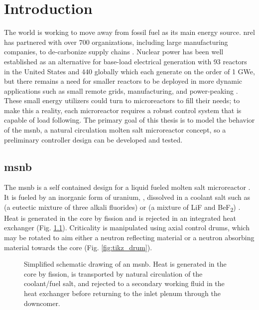 \chapter{Introduction}
\label{Chapter:Introduction}
The world is working to move away from fossil fuel as its main energy source. \acf{nrel} has partnered with over 700 organizations, including large manufacturing companies, to de-carbonize supply chains \cite{NREL-partner}. Nuclear power has been well established as an alternative for base-load electrical generation with 93 reactors in the United States and 440 globally which each generate on the order of 1 GWe, but there remains a need for smaller reactors to be deployed in more dynamic applications such as small remote grids, manufacturing, and power-peaking \cite{DoD-remote,AirForce}. These small energy utilizers could turn to microreactors to fill their needs; to make this a reality, each microreactor requires a robust control system that is capable of load following. The primary goal of this thesis is to model the behavior of the \acf{msnb}, a natural circulation molten salt microreactor concept, so a preliminary controller design can be developed and tested.

\section{\texorpdfstring{\acl{msnb}}{Molten Salt Nuclear Battery}}
The \acs{msnb} is a self contained design for a liquid fueled molten salt microreactor \cite{CarterPHD,PetersonMS}. It is fueled by an inorganic form of uranium, \UF, dissolved in a coolant salt such as \flinak (a eutectic mixture of three alkali fluorides) or \flibe  (a mixture of LiF and BeF\textsubscript{2}) \cite{RoperOverview}. Heat is generated in the core by fission and is rejected in an integrated heat exchanger (Fig. \ref{fig:tikz_msnb}). Criticality is manipulated using axial control drums, which may be rotated to aim either a neutron reflecting material or a neutron absorbing material towards the core (Fig. \ref{fig:tikz_drum}).

\begin{figure}[!ht]
    \centering
    
    \caption[Simplified schematic drawing of an \acs{msnb}]{Simplified schematic drawing of an \acs{msnb}. Heat is generated in the core by fission, is transported by natural circulation of the coolant/fuel salt, and rejected to a secondary working fluid in the heat exchanger before returning to the inlet plenum through the downcomer.}
    \label{fig:tikz_msnb}
\end{figure}

